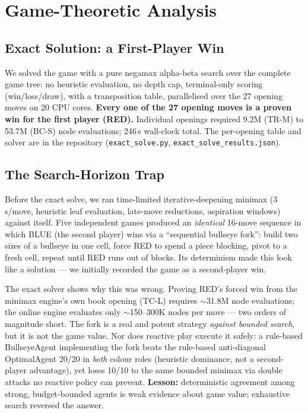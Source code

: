 \documentclass[10pt,twocolumn]{article}
\begin{document}
\section{Game-Theoretic Analysis}
\label{sec:gametheory}

\subsection{Exact Solution: a First-Player Win}
\label{sec:exact}

We solved the game with a pure negamax alpha-beta search over the complete
game tree: no heuristic evaluation, no depth cap, terminal-only scoring
(win/loss/draw), with a transposition table, parallelised over the 27
opening moves on 20 CPU cores. \textbf{Every one of the 27 opening moves is a
proven win for the first player (RED).} Individual openings required 9.2M
(TR-M) to 53.7M (BC-S) node evaluations; 246\,s wall-clock total. The
per-opening table and solver are in the repository
(\texttt{exact\_solve.py}, \texttt{exact\_solve\_results.json}).

\subsection{The Search-Horizon Trap}
\label{sec:horizon}

Before the exact solve, we ran time-limited iterative-deepening minimax
(3\,s/move, heuristic leaf evaluation, late-move reductions, aspiration
windows) against itself. Five independent games produced an \emph{identical}
16-move sequence in which BLUE (the second player) wins via a ``sequential
bullseye fork'': build two sizes of a bullseye in one cell, force RED to
spend a piece blocking, pivot to a fresh cell, repeat until RED runs out of
blocks. Its determinism made this look like a solution --- we initially
recorded the game as a second-player win.

The exact solver shows why this was wrong. Proving RED's forced win from the
minimax engine's own book opening (TC-L) requires $\sim$31.8M node
evaluations; the online engine evaluates only $\sim$150--300K nodes per move
--- two orders of magnitude short. The fork is a real and potent strategy
\emph{against bounded search}, but it is not the game value. Nor does
reactive play execute it safely: a rule-based BullseyeAgent implementing the
fork beats the rule-based anti-diagonal OptimalAgent 20/20 in \emph{both}
colour roles (heuristic dominance, not a second-player advantage), yet loses
10/10 to the same bounded minimax via double attacks no reactive policy can
prevent. \textbf{Lesson:} deterministic agreement among strong, budget-bounded
agents is weak evidence about game value; exhaustive search reversed the
answer.
\end{document}
